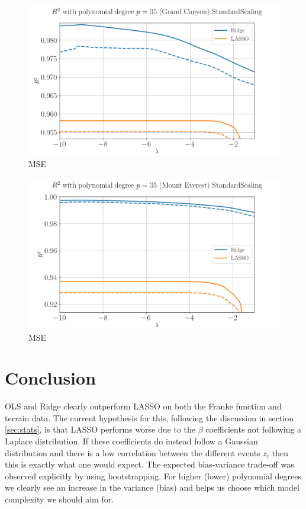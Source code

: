 \documentclass[%
reprint,
amsmath,amssymb,
aps,
pra,
]{revtex4-2}
\begin{document}
\begin{figure}[ht!]
	\centering
	\includegraphics[width=\linewidth]{Python/Figures/Terrain/logR2_GrandCanStandardScaling_35_zoomed.png}
	\caption{MSE}
	\label{fig:log_GrandCan_StandardScaling_35}
\end{figure}

\begin{figure}[ht!]
	\centering
	\includegraphics[width=\linewidth]{Python/Figures/Terrain/logR2_MountEver_standardscaling_35_zoomed.png}
	\caption{MSE}
	\label{fig:log_MountEve_StandardScaling_35}
\end{figure}

\section{Conclusion}
OLS and Ridge clearly outperform LASSO on both the Franke function and terrain data. The current hypothesis for this, following the discussion in section \ref{sec:stats}, is that LASSO performs worse due to the $\beta$ coefficients not following a Laplace distribution. If these coefficients do instead follow a Gaussian distribution and there is a low correlation between the different events $z_i$ then this is exactly what one would expect. The expected bias-variance trade-off was observed explicitly by using bootstrapping. For higher (lower) polynomial degrees we clearly see an increase in the variance (bias) and helps us choose which model complexity we should aim for. 
\end{document}
